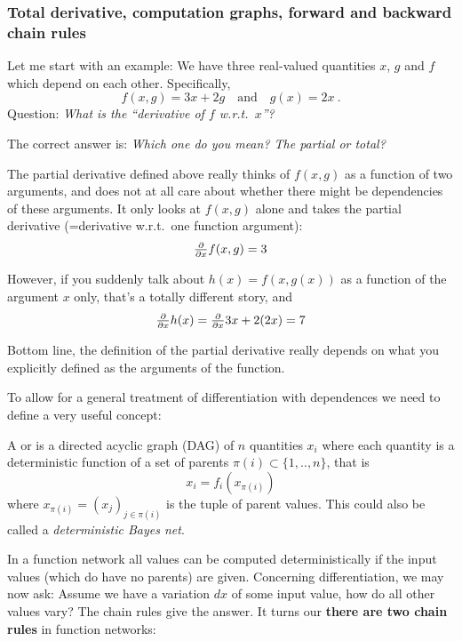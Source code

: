 \subsubsection{Total derivative, computation graphs, forward and backward chain rules}

Let me start with an example: We have three real-valued quantities $x$, $g$ and $f$
which depend on each other. Specifically,
\begin{equation}
f(x,g) = 3x + 2g \quad \text{and}\quad g(x)=2 x ~.
\end{equation}
Question: \emph{What is the ``derivative of $f$ w.r.t.\ $x$''?}

The correct answer is: \emph{Which one do you mean? The partial or total?}

The partial derivative defined above really thinks of $f(x,g)$ as a
function of two arguments, and does not at all care about
whether there might be dependencies of these arguments. It only looks
at $f(x,g)$ alone and takes the partial derivative (=derivative
w.r.t.\ one function argument):
\begin{equation}
\textstyle\frac{\partial}{\partial x} f(x,g) = 3 
\end{equation}

However, if you suddenly talk about $h(x) = f(x,g(x))$ as a function of the argument $x$ only, that's a totally different story, and
\begin{equation}
\textstyle\frac{\partial}{\partial x} h(x) = \textstyle\frac{\partial}{\partial x} 3x+2(2x) = 7 
\end{equation}

Bottom line, the definition of the partial derivative really depends
on what you explicitly defined as the arguments of the function.

To allow for a general treatment of differentiation with dependences we need to define a very useful concept:
\begin{myDefinition}
A  or  is a directed acyclic graph (DAG) of $n$ quantities $x_i$ where each quantity is a deterministic function of a set of parents
$\pi(i)\subset\{1,..,n\}$, that is
\begin{equation}
x_i = f_i( x_{\pi(i)} ) 
\end{equation}
where $x_{\pi(i)} = (x_j)_{j \in \pi(i)}$
is the tuple of parent values. This could also be
called a \emph{deterministic Bayes net}.
\end{myDefinition}

In a function network all values can be computed deterministically if
the input values (which do have no parents) are given. Concerning differentiation, we may now ask: Assume
we have a variation $dx$ of some input value, how do all other values
vary? The chain rules give the answer. It turns our \textbf{there are two chain rules} in function networks:


